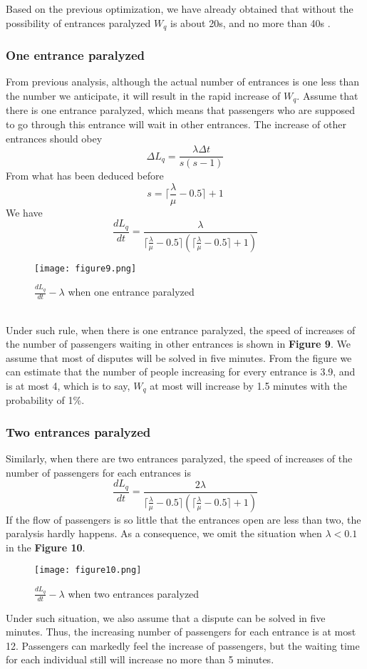 \documentclass{mcmthesis}
\begin{document}
Based on the previous optimization, we have already obtained that without the possibility of entrances paralyzed $W_q$ is about 20s, and no more than 40s .
\subsubsection{One entrance paralyzed}
From previous analysis, although the actual number of entrances is one less than the number we anticipate, it will result in the rapid increase of $W_q$. Assume that there is one entrance paralyzed, which means that passengers who are supposed to go through this entrance will wait in other entrances. The increase of other entrances should obey
$$\Delta L_q=\frac{\lambda\Delta t}{s(s-1)}$$
From what has been deduced before
$$s=\lceil\frac{\lambda}{\mu}-0.5\rceil+1$$
We have
$$\frac{dL_q}{dt}=\frac{\lambda}{\lceil\frac{\lambda}{\mu}-0.5\rceil(\lceil\frac{\lambda}{\mu}-0.5\rceil +1)}$$
\begin{figure}[h]
\small
\centering
\texttt{[image: figure9.png]}
\caption{$\frac{dL_q}{dt}-\lambda$ when one entrance paralyzed} \label{fig:9}
\end{figure}\\
Under such rule, when there is one entrance paralyzed, the speed of increases of the number of passengers waiting in other entrances is shown in \textbf{Figure 9}. We assume that most of disputes will be solved in five minutes. From the figure we can estimate that the number of people increasing for every entrance is 3.9, and is at most 4, which is to say, $W_q$ at most will increase by 1.5 minutes with the probability of 1\%.
\subsubsection{Two entrances paralyzed}
Similarly, when there are two entrances paralyzed, the speed of increases of the number of passengers for each entrances is
$$\frac{dL_q}{dt}=\frac{2\lambda}{\lceil\frac{\lambda}{\mu}-0.5\rceil(\lceil\frac{\lambda}{\mu}-0.5\rceil +1)}$$
If the flow of passengers is so little that the entrances open are less than two, the paralysis hardly happens. As a consequence, we omit the situation when $\lambda<0.1$ in the \textbf{Figure 10}.
\begin{figure}[h]
\small
\centering
\texttt{[image: figure10.png]}
\caption{$\frac{dL_q}{dt}-\lambda$ when two entrances paralyzed} \label{fig:10}
\end{figure}
Under such situation, we also assume that a dispute can be solved in five minutes. Thus, the increasing number of passengers for each entrance is at most 12. Passengers can markedly feel the increase of passengers, but the waiting time for each individual still will increase no more than 5 minutes.
\end{document}
